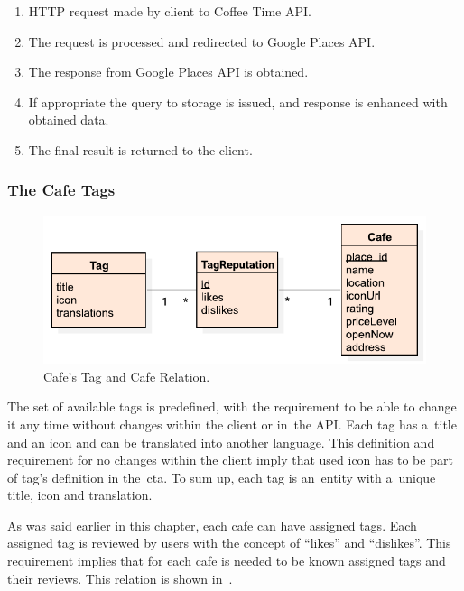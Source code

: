 \begin{enumerate}
    \item HTTP request made by client to Coffee Time API.
    \item The request is processed and redirected to Google Places API.
    \item The response from Google Places API is obtained.
    \item If appropriate the query to storage is issued, and response is enhanced with obtained data.
    \item The final result is returned to the client.
\end{enumerate}
\subsubsection{The Cafe Tags}

\begin{figure}[ht]
    \centering
    \includegraphics[width=0.8\linewidth]{img/analysis/tag-cafe-relation.pdf}
    \caption{Cafe's Tag and Cafe Relation.}
    \label{fig:tag-cafe-relation}
\end{figure}

The set of available tags is predefined, with the requirement to be able to change it any time without changes within the client or in~the API. Each tag has a~title and an icon and can be translated into another language. This definition and requirement for no changes within the client imply that used icon has to be part of tag's definition in the~\gls{cta}. To sum up, each tag is an~entity with a~unique title, icon and translation. 

As was said earlier in this chapter, each cafe can have assigned tags. Each assigned tag is reviewed by users with the concept of ``likes'' and ``dislikes''.  This requirement implies that for each cafe is needed to be known assigned tags and their reviews. This relation is shown in~.
